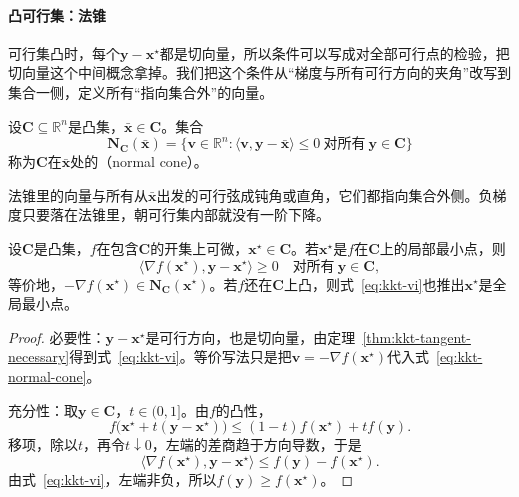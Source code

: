 \paragraph{凸可行集：法锥}
可行集凸时，每个$\bm{y}-\bm{x}^\star$都是切向量，所以条件可以写成对全部可行点的检验，把切向量这个中间概念拿掉。我们把这个条件从“梯度与所有可行方向的夹角”改写到集合一侧，定义所有“指向集合外”的向量。

\begin{definition}[法锥]
\label{def:kkt-normal-cone}
设$\bm{C}\subseteq\mathbb{R}^n$是凸集，$\bar{\bm{x}}\in\bm{C}$。集合
\begin{equation}
 \bm{N}_{\bm{C}}(\bar{\bm{x}})=\{\bm{v}\in\mathbb{R}^n:\langle\bm{v},\bm{y}-\bar{\bm{x}}\rangle\leq0\ \text{对所有}\ \bm{y}\in\bm{C}\}
 \label{eq:kkt-normal-cone}
\end{equation}
称为$\bm{C}$在$\bar{\bm{x}}$处的（normal cone）。
\end{definition}

法锥里的向量与所有从$\bar{\bm{x}}$出发的可行弦成钝角或直角，它们都指向集合外侧。负梯度只要落在法锥里，朝可行集内部就没有一阶下降。

\begin{theorem}[凸可行集上的一阶条件]
\label{thm:kkt-convex-set-first-order}
设$\bm{C}$是凸集，$f$在包含$\bm{C}$的开集上可微，$\bm{x}^\star\in\bm{C}$。若$\bm{x}^\star$是$f$在$\bm{C}$上的局部最小点，则
\begin{equation}
 \langle\nabla f(\bm{x}^\star),\bm{y}-\bm{x}^\star\rangle\geq0\quad\text{对所有}\ \bm{y}\in\bm{C},
 \label{eq:kkt-vi}
\end{equation}
等价地，$-\nabla f(\bm{x}^\star)\in\bm{N}_{\bm{C}}(\bm{x}^\star)$。若$f$还在$\bm{C}$上凸，则式~\eqref{eq:kkt-vi}也推出$\bm{x}^\star$是全局最小点。
\end{theorem}

\begin{proof}
必要性：$\bm{y}-\bm{x}^\star$是可行方向，也是切向量，由定理~\ref{thm:kkt-tangent-necessary}得到式~\eqref{eq:kkt-vi}。等价写法只是把$\bm{v}=-\nabla f(\bm{x}^\star)$代入式~\eqref{eq:kkt-normal-cone}。

充分性：取$\bm{y}\in\bm{C}$，$t\in(0,1]$。由$f$的凸性，
\[
 f\bigl(\bm{x}^\star+t(\bm{y}-\bm{x}^\star)\bigr)\leq(1-t)f(\bm{x}^\star)+tf(\bm{y}).
\]
移项，除以$t$，再令$t\downarrow0$，左端的差商趋于方向导数，于是
\[
 \langle\nabla f(\bm{x}^\star),\bm{y}-\bm{x}^\star\rangle\leq f(\bm{y})-f(\bm{x}^\star).
\]
由式~\eqref{eq:kkt-vi}，左端非负，所以$f(\bm{y})\geq f(\bm{x}^\star)$。
\end{proof}

